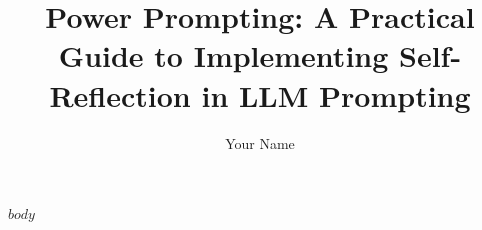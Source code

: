 \documentclass[11pt,a4paper]{article}
\title{\textcolor{linkedinblue}{\textbf{Power Prompting: A Practical Guide to Implementing Self-Reflection in LLM Prompting}}}
\author{Your Name}
\date{}
\begin{document}
\maketitle

\tableofcontents

\newpage

$body$
\end{document}

